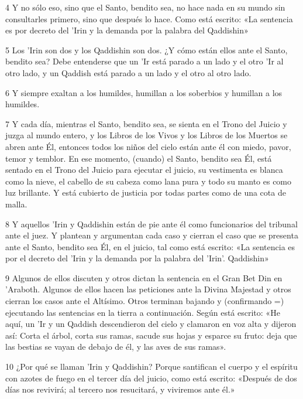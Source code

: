 \par 4 Y no sólo eso, sino que el Santo, bendito sea, no hace nada en su mundo sin consultarles primero, sino que después lo hace. Como está escrito: «La sentencia es por decreto del 'Irin y la demanda por la palabra del Qaddishin»

\par 5 Los 'Irin son dos y los Qaddishin son dos. ¿Y cómo están ellos ante el Santo, bendito sea? Debe entenderse que un 'Ir está parado a un lado y el otro 'Ir al otro lado, y un Qaddish está parado a un lado y el otro al otro lado.

\par 6 Y siempre exaltan a los humildes, humillan a los soberbios y humillan a los humildes.

\par 7 Y cada día, mientras el Santo, bendito sea, se sienta en el Trono del Juicio y juzga al mundo entero, y los Libros de los Vivos y los Libros de los Muertos se abren ante Él, entonces todos los niños del cielo están ante él con miedo, pavor, temor y temblor. En ese momento, (cuando) el Santo, bendito sea Él, está sentado en el Trono del Juicio para ejecutar el juicio, su vestimenta es blanca como la nieve, el cabello de su cabeza como lana pura y todo su manto es como luz brillante. Y está cubierto de justicia por todas partes como de una cota de malla.

\par 8 Y aquellos 'Irin y Qaddishin están de pie ante él como funcionarios del tribunal ante el juez. Y plantean y argumentan cada caso y cierran el caso que se presenta ante el Santo, bendito sea Él, en el juicio, tal como está escrito: «La sentencia es por el decreto del 'Irin y la demanda por la palabra del 'Irin'. Qaddishin»

\par 9 Algunos de ellos discuten y otros dictan la sentencia en el Gran Bet Din en 'Araboth. Algunos de ellos hacen las peticiones ante la Divina Majestad y otros cierran los casos ante el Altísimo. Otros terminan bajando y (confirmando =) ejecutando las sentencias en la tierra a continuación. Según está escrito: «He aquí, un 'Ir y un Qaddish descendieron del cielo y clamaron en voz alta y dijeron así: Corta el árbol, corta sus ramas, sacude sus hojas y esparce su fruto: deja que las bestias se vayan de debajo de él, y las aves de sus ramas».

\par 10 ¿Por qué se llaman 'Irin y Qaddishin? Porque santifican el cuerpo y el espíritu con azotes de fuego en el tercer día del juicio, como está escrito: «Después de dos días nos revivirá; al tercero nos resucitará, y viviremos ante él.»


